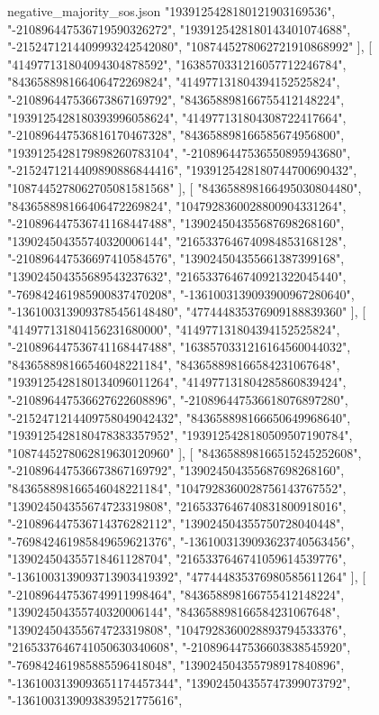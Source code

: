 \begin{filecontents*}[overwrite]{negative_majority_sos.json}
    "1939125428180121903169536",
    "-210896447536719590326272",
    "1939125428180143401074688",
    "-2152471214409993242542080",
    "1087445278062721910868992"
   ],
   [
    "414977131804094304878592",
    "1638570331216057712246784",
    "843658898166406472269824",
    "414977131804394152525824",
    "-210896447536673867169792",
    "843658898166755412148224",
    "1939125428180393996058624",
    "414977131804308722417664",
    "-210896447536816170467328",
    "843658898166585674956800",
    "1939125428179898260783104",
    "-210896447536550895943680",
    "-2152471214409890886844416",
    "1939125428180744700690432",
    "1087445278062705081581568"
   ],
   [
    "843658898166495030804480",
    "843658898166406472269824",
    "1047928360028800904331264",
    "-210896447536741168447488",
    "139024504355687698268160",
    "139024504355740320006144",
    "2165337646740984853168128",
    "-210896447536697410584576",
    "139024504355661387399168",
    "139024504355689543237632",
    "2165337646740921322045440",
    "-769842461985900837470208",
    "-1361003139093900967280640",
    "-1361003139093785456148480",
    "477444835376909188839360"
   ],
   [
    "414977131804156231680000",
    "414977131804394152525824",
    "-210896447536741168447488",
    "1638570331216164560044032",
    "843658898166546048221184",
    "843658898166584231067648",
    "1939125428180134096011264",
    "414977131804285860839424",
    "-210896447536627622608896",
    "-210896447536618076897280",
    "-2152471214409758049042432",
    "843658898166650649968640",
    "1939125428180478383357952",
    "1939125428180509507190784",
    "1087445278062819630120960"
   ],
   [
    "843658898166515245252608",
    "-210896447536673867169792",
    "139024504355687698268160",
    "843658898166546048221184",
    "1047928360028756143767552",
    "139024504355674723319808",
    "2165337646740831800918016",
    "-210896447536714376282112",
    "139024504355750728040448",
    "-769842461985849659621376",
    "-1361003139093623740563456",
    "139024504355718461128704",
    "2165337646741059614539776",
    "-1361003139093713903419392",
    "477444835376980585611264"
   ],
   [
    "-210896447536749911998464",
    "843658898166755412148224",
    "139024504355740320006144",
    "843658898166584231067648",
    "139024504355674723319808",
    "1047928360028893794533376",
    "2165337646741050630340608",
    "-210896447536603838545920",
    "-769842461985885596418048",
    "139024504355798917840896",
    "-1361003139093651174457344",
    "139024504355747399073792",
    "-1361003139093839521775616",

\end{filecontents*}
